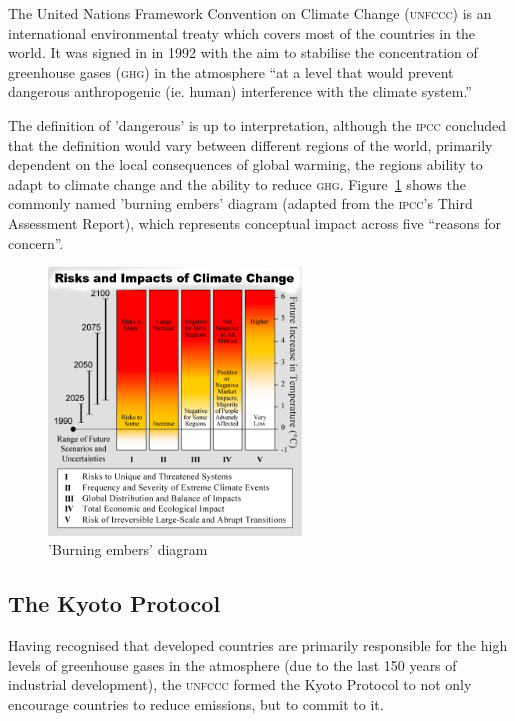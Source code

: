 The United Nations Framework Convention on Climate Change (\textsc{unfccc}) is an international environmental treaty which covers most of the countries in the world. It was signed in in 1992 with the aim to stabilise the concentration of greenhouse gases (\textsc{ghg}) in the atmosphere ``at a level that would prevent dangerous anthropogenic (ie. human) interference with the climate system.''~\cite{IPCC-synthesis-01-question1}

The definition of 'dangerous' is up to interpretation, although the \textsc{ipcc} concluded that the definition would vary between different regions of the world, primarily dependent on the local consequences of global warming, the regions ability to adapt to climate change and the ability to reduce \textsc{ghg}. Figure~\ref{fig:burning_embers} shows the commonly named 'burning embers' diagram (adapted from the \textsc{ipcc}'s Third Assessment Report), which represents conceptual impact across five ``reasons for concern''.

\begin{figure}[h!]
	\centering
	\includegraphics[width=0.6\textwidth]{img/Risks_and_Impacts_of_Global_Warming.png}
	\caption{'Burning embers' diagram~\cite{IPCC-workinggroup-01}}
	\label{fig:burning_embers}
\end{figure}

\subsection{The Kyoto Protocol}

Having recognised that developed countries are primarily responsible for the high levels of greenhouse gases in the atmosphere (due to the last 150 years of industrial development), the \textsc{unfccc} formed the Kyoto Protocol to not only encourage countries to reduce emissions, but to commit to it.~\cite{UNFCCC-kyoto-summary}

